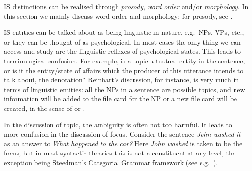 \documentclass[output=paper,hidelinks]{langscibook}
\begin{document}
IS distinctions can be realized through \textit{prosody}, \textit{word order} and/or \textit{morphology}. In this section we mainly discuss word order and morphology; for prosody, see .
 
IS entities can be talked about as being linguistic in nature, e.g.\ NPs, VPs, etc., or they can be thought of as psychological. In most cases the only thing we can access and study are the linguistic reflexes of psychological states. This leads to terminological confusion. For example, is a topic a textual entity in the sentence, or is it the entity/state of affairs which the producer of this utterance intends to talk about, the denotation? Reinhart's discussion, for instance, is very much in terms of linguistic entities:  all the NPs in a sentence are possible topics, and new information will be added to the file card for the NP or a new file card will be created, in the sense of \citet{Heim82} or \citet{Kamp81}.

\largerpage
In the discussion of topic, the ambiguity is often not too harmful. It leads to more confusion in the discussion of focus. Consider the sentence \textit{John washed it} as an answer to \textit{What happened to the car?} Here \textit{John washed} is taken to be the focus, but in most syntactic theories this is not a constituent at any level, the exception being Steedman's Categorial Grammar framework (see e.g.\ \citealt{steedman00}).
\end{document}
